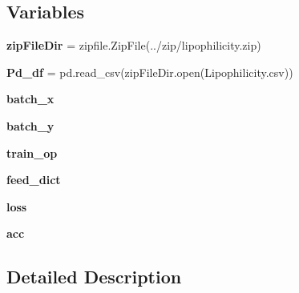 \subsection*{Variables}
\begin{DoxyCompactItemize}
\item
\mbox{\label{namespacechemistry2quant_1_1chem2quant__lipophilicity_a71b15fb108d9044fcedeb23bd1b6c85f}}
{\bfseries zip\+File\+Dir} = zipfile.\+Zip\+File(\textquotesingle{}../zip/lipophilicity.\+zip\textquotesingle{})
\item
\mbox{\label{namespacechemistry2quant_1_1chem2quant__lipophilicity_a7147214fc95c63ac8973e5029561b931}}
{\bfseries Pd\+\_\+df} = pd.\+read\+\_\+csv(zip\+File\+Dir.\+open(\textquotesingle{}Lipophilicity.\+csv\textquotesingle{}))
\item
\mbox{\label{namespacechemistry2quant_1_1chem2quant__lipophilicity_a3088c63f3c0976945edeec5ee068117f}}
{\bfseries batch\+\_\+x}
\item
\mbox{\label{namespacechemistry2quant_1_1chem2quant__lipophilicity_a8cebae2fba412595caf977e5916c44c8}}
{\bfseries batch\+\_\+y}
\item
\mbox{\label{namespacechemistry2quant_1_1chem2quant__lipophilicity_a09c48f7917229c48ec00c846b58c1d95}}
{\bfseries train\+\_\+op}
\item
\mbox{\label{namespacechemistry2quant_1_1chem2quant__lipophilicity_a7475a4cf525738bc1b787767a50de969}}
{\bfseries feed\+\_\+dict}
\item
\mbox{\label{namespacechemistry2quant_1_1chem2quant__lipophilicity_af186d229e2c07852c9e86571e7f6a9bb}}
{\bfseries loss}
\item
\mbox{\label{namespacechemistry2quant_1_1chem2quant__lipophilicity_a380004285ce55e7904555491af03d96e}}
{\bfseries acc}
\end{DoxyCompactItemize}


\subsection{Detailed Description}
\begin{DoxyVerb}\end{DoxyVerb}

